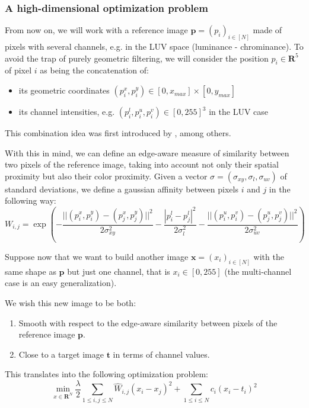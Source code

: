 \documentclass{article}
\begin{document}
\subsubsection{A high-dimensional optimization problem}

From now on, we will work with a reference image $\textbf{p} = (p_i)_{i \in [N]}$ made of pixels with several channels, e.g. in the  LUV space (luminance - chrominance). To avoid the trap of purely geometric filtering, we will consider the position $p_i \in \textbf{R}^5$ of pixel $i$ as being the concatenation of:
\begin{itemize}
    \item its geometric coordinates $(p_i^x, p_i^y) \in [0, x_{max}] \times [0, y_{max}]$
    \item its channel intensities, e.g. $(p_i^l, p_i^u, p_i^v) \in [0, 255]^3$ in the LUV case
\end{itemize}

This combination idea was first introduced by \cite{tomasi_bilateral_1998}, among others.

With this in mind, we can define an edge-aware measure of similarity between two pixels of the reference image, taking into account not only their spatial proximity but also their color proximity. Given a vector $\sigma = (\sigma_{xy}, \sigma_l, \sigma_{uv})$ of standard deviations, we define a gaussian affinity between pixels $i$ and $j$ in the following way:
\begin{equation}
    W_{i, j} = \exp \left(
    - \frac{|| (p_i^x, p_i^y) - (p_j^x, p_j^y) ||^2}{2 \sigma_{xy}^2}
    - \frac{| p_i^l - p_j^l |^2}{2 \sigma_l^2}
    - \frac{|| (p_i^u, p_i^v) - (p_j^u, p_j^v) ||^2}{2 \sigma_{uv}^2}
     \right)
\end{equation}

Suppose now that we want to build another image $\textbf{x} = (x_i)_{i \in [N]}$ with the same shape as $\textbf{p}$ but just one channel, that is $x_i \in [0, 255]$ (the multi-channel case is an easy generalization).

We wish this new image to be both:
\begin{enumerate}
    \item Smooth with respect to the edge-aware similarity between pixels of the reference image $\textbf{p}$.
    \item Close to a target image $\textbf{t}$ in terms of channel values.
\end{enumerate}

This translates into the following optimization problem:
\begin{equation} \label{optim}
    \min_{x \in \textbf{R}^N} \frac{\lambda}{2} \sum_{1 \leq i, j \leq N}{\hat{W}_{i, j} (x_i - x_j)^2} + \sum_{1 \leq i \leq N}{c_i (x_i - t_i)^2}
\end{equation}
\end{document}
